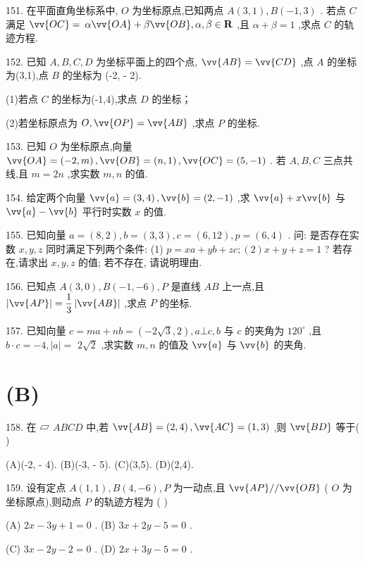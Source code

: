 151. 在平面直角坐标系中, $O$ 为坐标原点,已知两点 $A\left( {3,1}\right) ,B\left( {-1,3}\right)$ . 若点 $C$ 满足 $\vv{OC} =$  $\alpha \vv{OA} + \beta \vv{OB},\alpha ,\beta  \in  \mathbf{R}$ ,且 $\alpha  + \beta  = 1$ ,求点 $C$ 的轨迹方程.

152. 已知 $A,B,C,D$ 为坐标平面上的四个点, $\vv{AB} = \vv{CD}$ ,点 $A$ 的坐标为(3,1),点 $B$ 的坐标为 (-2, - 2).

(1)若点 $C$ 的坐标为(-1,4),求点 $D$ 的坐标；

(2)若坐标原点为 $O,\vv{OP} = \vv{AB}$ ,求点 $P$ 的坐标.

153. 已知 $O$ 为坐标原点,向量 $\vv{OA} = \left( {-2,m}\right) ,\vv{OB} = \left( {n,1}\right) ,\vv{OC} = \left( {5, - 1}\right)$ . 若 $A,B,C$ 三点共线,且 $m = {2n}$ ,求实数 $m,n$ 的值.

154. 给定两个向量 $\vv{a} = \left( {3,4}\right) ,\vv{b} = \left( {2, - 1}\right)$ ,求 $\vv{a} + x\vv{b}$ 与 $\vv{a} - \vv{b}$ 平行时实数 $x$ 的值.

155. 已知向量 $a = \left( {8,2}\right) ,b = \left( {3,3}\right) ,c = \left( {6,{12}}\right) ,p = \left( {6,4}\right)$ . 问: 是否存在实数 $x,y,z$ 同时满足下列两个条件: (1) $p = {xa} + {yb} + {zc};\left( 2\right) x + y + z = 1$ ? 若存在,请求出 $x,y,z$ 的值; 若不存在, 请说明理由.

156. 已知点 $A\left( {3,0}\right) ,B\left( {-1, - 6}\right) ,P$ 是直线 ${AB}$ 上一点,且 $\left| \vv{AP}\right|  = \dfrac{1}{3}\left| \vv{AB}\right|$ ,求点 $P$ 的坐标.

157. 已知向量 $c = {ma} + {nb} = \left( {-2\sqrt{3},2}\right) ,a \bot  c,b$ 与 $c$ 的夹角为 ${120}^{ \circ  }$ ,且 $b \cdot  c =  - 4,\left| a\right|  =$  $2\sqrt{2}$ ,求实数 $m,n$ 的值及 $\vv{a}$ 与 $\vv{b}$ 的夹角.

\section*{(B)}

158. 在 ▱ ${ABCD}$ 中,若 $\vv{AB} = \left( {2,4}\right) ,\vv{AC} = \left( {1,3}\right)$ ,则 $\vv{BD}$ 等于(   )

(A)(-2, - 4). (B)(-3, - 5). (C)(3,5). (D)(2,4).

159. 设有定点 $A\left( {1,1}\right) ,B\left( {4, - 6}\right) ,P$ 为一动点,且 $\vv{AP}//\vv{OB}$ ( $O$ 为坐标原点),则动点 $P$ 的轨迹方程为 (   )

(A) ${2x} - {3y} + 1 = 0$ . (B) ${3x} + {2y} - 5 = 0$ .

(C) ${3x} - {2y} - 2 = 0$ . (D) ${2x} + {3y} - 5 = 0$ .

